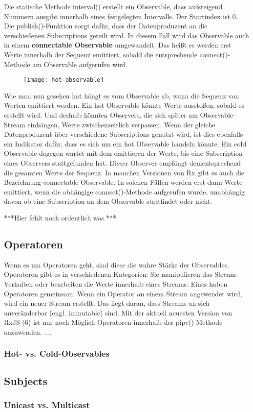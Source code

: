 \noindent
Die statische Methode interval() erstellt ein Observable, dass aufsteigend Nummern ausgibt innerhalb eines festgelegten Intervalls. Der Startindex ist 0. Die publish()-Funktion sorgt dafür, dass der Datenproduzent an die verschiedenen Subscriptions geteilt wird. In diesem Fall wird das Observable auch in einem \textbf{connectable Observable} umgewandelt. Das heißt es werden erst Werte innerhalb der Sequenz emittiert, sobald die entsprechende connect()-Methode am Observable aufgerufen wird.\\

\begin{figure}[H]
\begin{center}
\texttt{[image: hot-observable]}
\end{center}
\end{figure}



\noindent
Wie man nun gesehen hat hängt es vom Observable ab, wann die Sequenz von Werten emittiert werden. Ein hot Observable könnte Werte ausstoßen, sobald es erstellt wird. Und deshalb könnten Observers, die sich später am Observable-Stream einhängen, Werte zwischenzeitlich verpassen. Wenn der gleiche Datenproduzent über verschiedene Subscriptions genutzt wird, ist dies ebenfalls ein Indikator dafür, dass es sich um ein hot Observable handeln könnte. Ein cold Observable dagegen wartet mit dem emittieren der Werte, bis eine Subscription eines Observers stattgefunden hat. Dieser Observer empfängt dementsprechend die gesamten Werte der Sequenz. In manchen Versionen von Rx gibt es auch die Bezeichnung connectable Observable. In solchen Fällen werden erst dann Werte emittiert, wenn die abhängige connect()-Methode aufgerufen wurde, unabhängig davon ob eine Subscription an dem Observable stattfindet oder nicht.\cite{hot-vs-cold-part-2}

\noindent
\begin{center}
***Hier fehlt noch ordentlich was.*** 
\end{center}


\subsection{Operatoren}
Wenn es um Operatoren geht, sind diese die wahre Stärke der Observables. Operatoren gibt es in verschiedenen Kategorien: Sie manipulieren das Stream-Verhalten oder bearbeiten die Werte innerhalb eines Streams. Eines haben Operatoren gemeinsam. Wenn ein Operator an einem Stream angewendet wird, wird ein neuer Stream erstellt. Das liegt daran, dass Streams an sich unveränderbar (engl. immutable) sind.
Mit der aktuell neuesten Version von RxJS (6) ist nur noch Möglich Operatoren innerhalb der pipe() Methode anzuwenden.  ....

\subsubsection{Hot- vs. Cold-Observables}
\subsection{Subjects}
\subsubsection{Unicast vs. Multicast}









